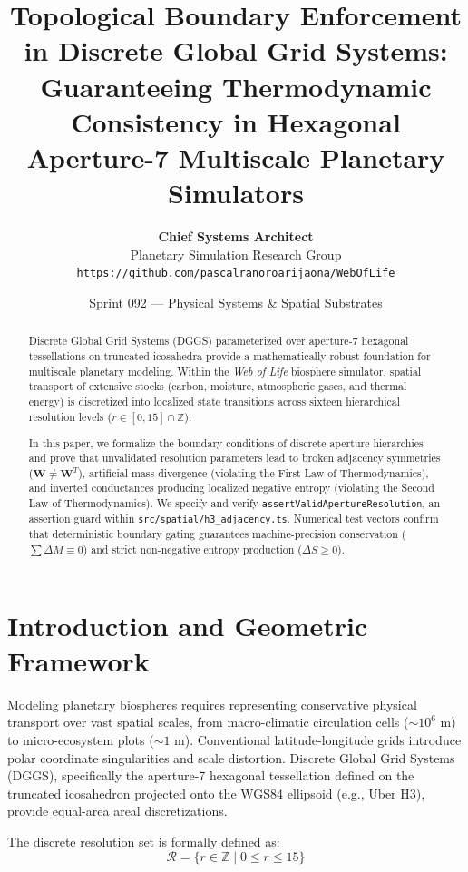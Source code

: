 \documentclass[11pt,a4paper]{article}
\title{\textbf{Topological Boundary Enforcement in Discrete Global Grid Systems:\\
Guaranteeing Thermodynamic Consistency in Hexagonal Aperture-7 Multiscale Planetary Simulators}}
\author{
  \textbf{Chief Systems Architect} \\
  Planetary Simulation Research Group \\
  \texttt{https://github.com/pascalranoroarijaona/WebOfLife}
}
\date{Sprint 092 --- Physical Systems \& Spatial Substrates}
\begin{document}
\maketitle

\begin{abstract}
Discrete Global Grid Systems (DGGS) parameterized over aperture-7 hexagonal tessellations on truncated icosahedra provide a mathematically robust foundation for multiscale planetary modeling. Within the \emph{Web of Life} biosphere simulator, spatial transport of extensive stocks (carbon, moisture, atmospheric gases, and thermal energy) is discretized into localized state transitions across sixteen hierarchical resolution levels ($r \in [0, 15] \cap \mathbb{Z}$). 

In this paper, we formalize the boundary conditions of discrete aperture hierarchies and prove that unvalidated resolution parameters lead to broken adjacency symmetries ($\mathbf{W} \ne \mathbf{W}^T$), artificial mass divergence (violating the First Law of Thermodynamics), and inverted conductances producing localized negative entropy (violating the Second Law of Thermodynamics). We specify and verify \texttt{assertValidApertureResolution}, an assertion guard within \texttt{src/spatial/h3\_adjacency.ts}. Numerical test vectors confirm that deterministic boundary gating guarantees machine-precision conservation ($\sum \Delta M \equiv 0$) and strict non-negative entropy production ($\Delta S \ge 0$).
\end{abstract}

\section{Introduction and Geometric Framework}

Modeling planetary biospheres requires representing conservative physical transport over vast spatial scales, from macro-climatic circulation cells ($\sim 10^6 \text{ m}$) to micro-ecosystem plots ($\sim 1 \text{ m}$). Conventional latitude-longitude grids introduce polar coordinate singularities and scale distortion. Discrete Global Grid Systems (DGGS), specifically the aperture-7 hexagonal tessellation defined on the truncated icosahedron projected onto the WGS84 ellipsoid (e.g., Uber H3), provide equal-area areal discretizations.

The discrete resolution set is formally defined as:
\begin{equation}
\mathcal{R} = \{ r \in \mathbb{Z} \mid 0 \le r \le 15 \}
\end{equation}
\end{document}
